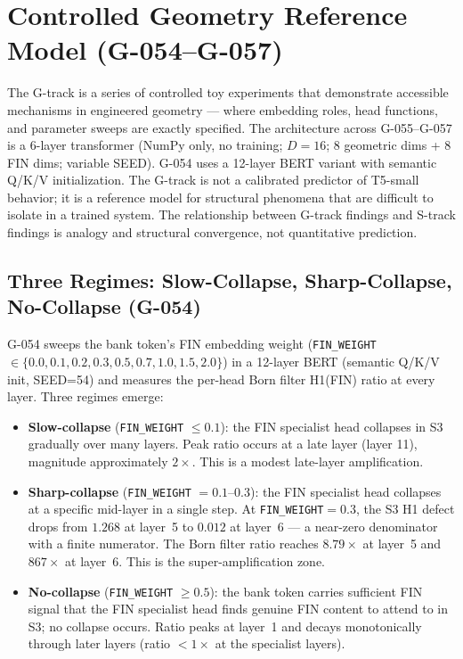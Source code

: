 \section{Controlled Geometry Reference Model (G-054--G-057)}
\label{sec:phase-diagram}

The G-track is a series of controlled toy experiments that demonstrate accessible
mechanisms in engineered geometry --- where embedding roles, head functions, and parameter
sweeps are exactly specified.
The architecture across G-055--G-057 is a 6-layer transformer (NumPy only, no training;
$D=16$; 8 geometric dims + 8 FIN dims; variable SEED).
G-054 uses a 12-layer BERT variant with semantic Q/K/V initialization.
The G-track is not a calibrated predictor of T5-small behavior; it is a reference model
for structural phenomena that are difficult to isolate in a trained system.
The relationship between G-track findings and S-track findings is analogy and structural
convergence, not quantitative prediction.

\subsection{Three Regimes: Slow-Collapse, Sharp-Collapse, No-Collapse (G-054)}

G-054 sweeps the bank token's FIN embedding weight
(\texttt{FIN\_WEIGHT} $\in \{0.0, 0.1, 0.2, 0.3, 0.5, 0.7, 1.0, 1.5, 2.0\}$) in a
12-layer BERT (semantic Q/K/V init, SEED=54) and measures the per-head Born filter
H1(FIN) ratio at every layer.
Three regimes emerge:

\begin{itemize}
  \item \textbf{Slow-collapse} (\texttt{FIN\_WEIGHT} $\leq 0.1$): the FIN specialist
    head collapses in S3 gradually over many layers.
    Peak ratio occurs at a late layer (layer 11), magnitude approximately $2\times$.
    This is a modest late-layer amplification.

  \item \textbf{Sharp-collapse} (\texttt{FIN\_WEIGHT} $= 0.1$--$0.3$): the FIN
    specialist head collapses at a specific mid-layer in a single step.
    At \texttt{FIN\_WEIGHT}$=0.3$, the S3 H1 defect drops from $1.268$ at layer~5
    to $0.012$ at layer~6 --- a near-zero denominator with a finite numerator.
    The Born filter ratio reaches $8.79\times$ at layer~5 and $867\times$ at layer~6.
    This is the super-amplification zone.

  \item \textbf{No-collapse} (\texttt{FIN\_WEIGHT} $\geq 0.5$): the bank token carries
    sufficient FIN signal that the FIN specialist head finds genuine FIN content to
    attend to in S3; no collapse occurs.
    Ratio peaks at layer~1 and decays monotonically through later layers (ratio $< 1\times$
    at the specialist layers).
\end{itemize}

